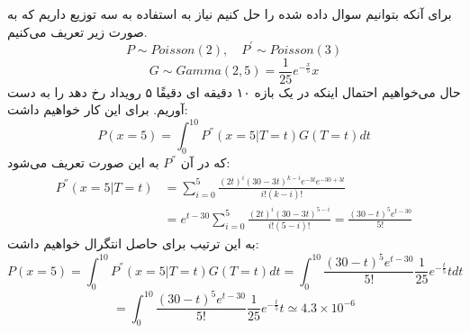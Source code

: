 برای آنکه بتوانیم سوال داده شده را حل کنیم نیاز به استفاده به سه توزیع داریم که به صورت زیر تعریف می‌کنیم.
$$P \sim Poisson(2), \quad P^{'}\sim Poisson(3)$$
$$G \sim Gamma(2, 5) = \frac{1}{25} e^{-\frac{x}{5}} x$$
حال می‌خواهیم احتمال اینکه در یک بازه ۱۰ دقیقه ای دقیقًا ۵ رویداد رخ دهد را به دست آوریم. برای این کار خواهیم داشت:
$$P(x = 5) = \int_0^{10} P^{''}(x = 5 | T = t) G (T = t) dt$$
که در آن
$P^{''}$
به این صورت تعریف می‌شود:
\begin{align*}
    P^{''}(x = 5 | T = t) &= \sum_{i = 0}^{5} \frac{(2t)^i(30 - 3t)^{k - i} e^{-3t} e^{-30 + 3t}}{i! (k - i)!} \\
                          &= e^{t - 30} \sum_{i = 0}^{5} \frac{(2t)^i (30 - 3t)^{5 - i}}{i!(5 - i)!} = \frac{(30 - t)^5 e^{t - 30}}{5!}
\end{align*}
به این ترتیب برای حاصل انتگرال خواهیم داشت:
$$P(x = 5) = \int_0^{10} P^{''}(x = 5 | T = t) G (T = t) dt = \int_0^{10} \frac{(30 - t)^5 e^{t - 30}}{5!} \frac{1}{25} e^{-\frac{t}{5}} t dt$$
$$= \int_0^{10} \frac{(30 - t)^5 e^{t - 30}}{5!} \frac{1}{25} e^{-\frac{t}{5}} t \simeq 4.3 \times 10^{-6}$$
